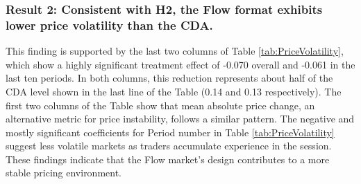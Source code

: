 \subsubsection*{Result 2: Consistent with H2, the Flow format exhibits lower price volatility than the CDA.}

This finding is supported by the last two columns of Table \ref{tab:PriceVolatility}, which show a highly significant treatment effect
of -0.070 overall and -0.061 in the last ten periods. In both columns, this reduction represents about half of the CDA level shown in the last line of the Table (0.14 and 0.13 respectively). The first two columns of the Table show that mean absolute price change, an alternative metric for price instability, follows a similar pattern. 
The negative and mostly significant coefficients for Period number in Table \ref{tab:PriceVolatility} suggest less volatile markets as traders accumulate experience in the session.
These findings indicate that the Flow market's design contributes to a more stable pricing environment. 


